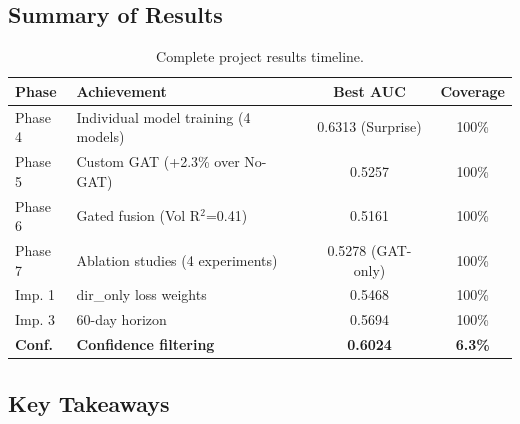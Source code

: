 \documentclass[12pt,a4paper]{article}
\begin{document}
\subsection{Summary of Results}

\begin{table}[H]
\centering
\caption{Complete project results timeline.}
\begin{tabular}{llcc}
\toprule
\textbf{Phase} & \textbf{Achievement} & \textbf{Best AUC} & \textbf{Coverage} \\
\midrule
Phase 4 & Individual model training (4 models) & 0.6313 (Surprise) & 100\% \\
Phase 5 & Custom GAT (+2.3\% over No-GAT) & 0.5257 & 100\% \\
Phase 6 & Gated fusion (Vol R$^2$=0.41) & 0.5161 & 100\% \\
Phase 7 & Ablation studies (4 experiments) & 0.5278 (GAT-only) & 100\% \\
Imp. 1 & dir\_only loss weights & 0.5468 & 100\% \\
Imp. 3 & 60-day horizon & 0.5694 & 100\% \\
\textbf{Conf.} & \textbf{Confidence filtering} & \textbf{0.6024} & \textbf{6.3\%} \\
\bottomrule
\end{tabular}
\end{table}

\subsection{Key Takeaways}
\end{document}
